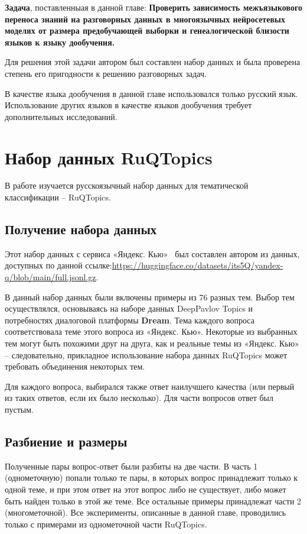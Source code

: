 \textbf{Задача}, поставленныая в данной главе: \textbf{Проверить зависимость межъязыкового переноса знаний на разговорных данных в многоязычных нейросетевых моделях от размера предобучающей выборки и генеалогической близости языков к языку дообучения.}

Для решения этой задачи автором был составлен набор данных и была проверена степень его пригодности к решению разговорных задач.

В качестве языка дообучения в данной главе использовался только русский язык. Использование других языков в качестве языков дообучения требует дополнительных исследований.

\section{Набор данных {RuQTopics}}

В работе изучается русскоязычный набор данных для тематической классификации -- {RuQTopics}.
\subsection{Получение набора данных}
Этот набор данных с сервиса «Яндекс. Кью»~\cite{yandex_q} был составлен автором из данных, доступных по данной ссылке:\url{https://huggingface.co/datasets/its5Q/yandex-q/blob/main/full.jsonl.gz}.

В данный набор данных были включены примеры из 76 разных тем. Выбор тем осуществлялся, основываясь на наборе данных {DeepPavlov Topics} и потребностях диалоговой платформы \textbf{Dream}. Тема каждого вопроса соответствовала теме этого вопроса из «Яндекс. Кью». Некоторые из выбранных тем могут быть похожими друг на друга, как и реальные темы из «Яндекс. Кью» -- следовательно, прикладное использование набора данных {RuQTopics} может требовать объединения некоторых тем.

 Для каждого вопроса, выбирался также ответ наилучшего качества (или первый из таких ответов, если их было несколько). Для части вопросов ответ был пустым. 
 

\subsection{Разбиение и размеры}
Полученные пары вопрос-ответ были разбиты на две части. В часть 1 (однометочную) попали только те пары, в которых вопрос принадлежит только к одной теме, и при этом ответ на этот вопрос либо не существует, либо может быть найден только в этой же теме. Все остальные примеры принадлежат части 2 (многометочной). Все эксперименты, описанные в данной главе, проводились только с примерами из однометочной части {RuQTopics}.


